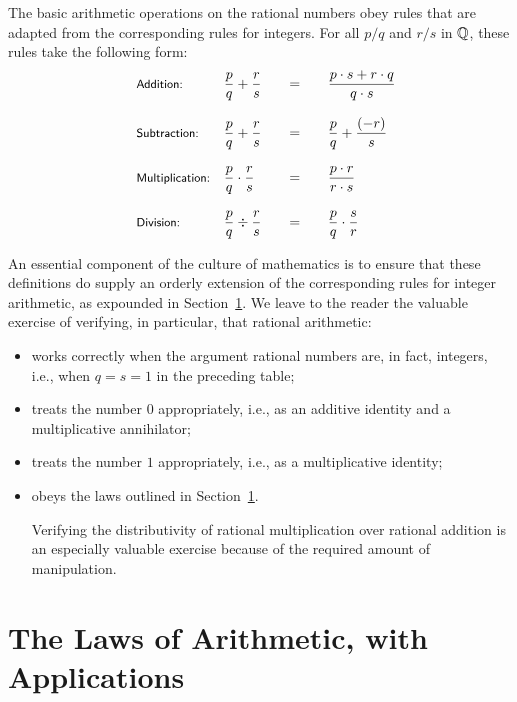 \medskip

The basic arithmetic operations on the rational numbers obey rules
that are adapted from the corresponding rules for integers.  For all
$p/q$ and $r/s$ in $\mathbb{Q}$, these rules take the following form:
\[
\begin{array}{llcccl}
\mbox{\small\sf Addition:} & 
{\displaystyle
{p \over q} + {r \over s} }
  & & = & &
{\displaystyle
 \frac{p \cdot s + r \cdot q}{q \cdot s} }  \\
 & & & & & \\
\mbox{\small\sf Subtraction:} &
{\displaystyle
{p \over q} + {r \over s} }
  & & = & &
{\displaystyle
{p \over q} + {(-r) \over s} } \\
 & & & & & \\
\mbox{\small\sf Multiplication:} &
{\displaystyle
{p \over q} \cdot {r \over s} }
  & & = & &
{\displaystyle
\frac{p \cdot r}{r \cdot s} } \\
  & & & & & \\
\mbox{\small\sf Division:} &
{\displaystyle
{p \over q} \div {r \over s} }
  & & = & &
{\displaystyle
{p \over q} \cdot {s \over r} }
\end{array}
\]

An essential component of the culture of mathematics is to ensure that
these definitions do supply an orderly extension of the corresponding
rules for integer arithmetic, as expounded in
Section~\ref{sec:Arithmetic-Laws}.  We leave to the reader the
valuable exercise of verifying, in particular, that rational
arithmetic:
\begin{itemize}
\item
works correctly when the argument rational numbers are, in fact,
integers, i.e., when $q = s = 1$ in the preceding table;
\item
treats the number $0$ appropriately, i.e., as an additive identity and
a multiplicative annihilator;
\item
treats the number $1$ appropriately, i.e., as a multiplicative identity;
\item
obeys the laws outlined in Section~\ref{sec:Arithmetic-Laws}.

Verifying the distributivity of rational multiplication over rational
addition is an especially valuable exercise because of the required
amount of manipulation.
\end{itemize}


\section{The Laws of Arithmetic, with Applications}
\label{sec:Arithmetic-Laws}

